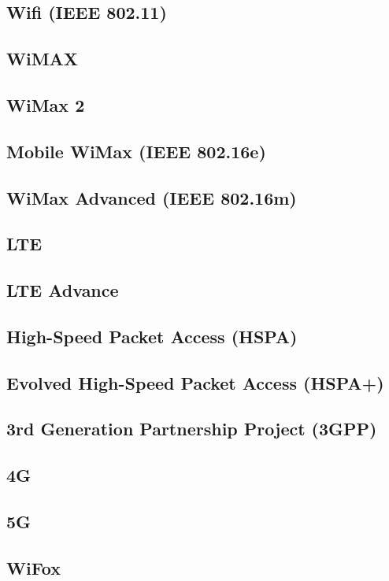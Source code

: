 \documentclass[journal]{IEEEtran}
\begin{document}
\subsection{ Wifi (IEEE 802.11) }
\subsection{ WiMAX }
\subsection{ WiMax 2 }
\subsection{ Mobile WiMax (IEEE 802.16e) }
\subsection{ WiMax Advanced (IEEE 802.16m) }
\subsection{ LTE }
\subsection{ LTE Advance }
\subsection{ High-Speed Packet Access (HSPA) }
\subsection{ Evolved High-Speed Packet Access (HSPA+) }
\subsection{ 3rd Generation Partnership Project (3GPP) }
\subsection{ 4G } 
\subsection{ 5G }
\subsection{ WiFox }
\end{document}
